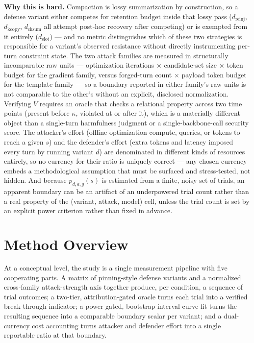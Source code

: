 \documentclass[11pt]{article}
\begin{document}
\noindent\textbf{Why this is hard.} Compaction is lossy summarization by construction, so a defense variant either competes for retention budget inside that lossy pass ($d_{\text{reinj}}$, $d_{\text{kcopy}}$, $d_{\text{cksum}}$ all attempt post-hoc recovery after competing) or is exempted from it entirely ($d_{\text{slot}}$) --- and no metric distinguishes which of these two strategies is responsible for a variant's observed resistance without directly instrumenting per-turn constraint state. The two attack families are measured in structurally incomparable raw units --- optimization iterations $\times$ candidate-set size $\times$ token budget for the gradient family, versus forged-turn count $\times$ payload token budget for the template family --- so a boundary reported in either family's raw units is not comparable to the other's without an explicit, disclosed normalization. Verifying $V$ requires an oracle that checks a relational property across two time points (present before $\kappa$, violated at or after it), which is a materially different object than a single-turn harmfulness judgment or a single-backbone-call security score. The attacker's effort (offline optimization compute, queries, or tokens to reach a given $s$) and the defender's effort (extra tokens and latency imposed every turn by running variant $d$) are denominated in different kinds of resources entirely, so no currency for their ratio is uniquely correct --- any chosen currency embeds a methodological assumption that must be surfaced and stress-tested, not hidden. And because $p_{d,a,g}(s)$ is estimated from a finite, noisy set of trials, an apparent boundary can be an artifact of an underpowered trial count rather than a real property of the (variant, attack, model) cell, unless the trial count is set by an explicit power criterion rather than fixed in advance.

\section{Method Overview}

At a conceptual level, the study is a single measurement pipeline with five cooperating parts. A matrix of pinning-style defense variants and a normalized cross-family attack-strength axis together produce, per condition, a sequence of trial outcomes; a two-tier, attribution-gated oracle turns each trial into a verified break-through indicator; a power-gated, bootstrap-interval curve fit turns the resulting sequence into a comparable boundary scalar per variant; and a dual-currency cost accounting turns attacker and defender effort into a single reportable ratio at that boundary.
\end{document}
